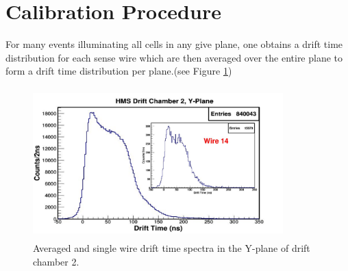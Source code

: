 \documentclass[journal, a4paper]{IEEEtran}
\begin{document}
\section{Calibration Procedure}
\noindent For many events illuminating all cells in any give plane, one obtains a drift time distribution
for each sense wire which are then averaged over the entire plane to form a drift time distribution per plane.(see Figure \ref{fig:hdc2y1_time})
\begin{figure}[!ht]
  \centering
  \includegraphics[width=3.8in, height=2.3in]{hdc2y1_time.pdf}
  \caption{Averaged and single wire drift time spectra in the Y-plane of drift chamber 2.}
  \label{fig:hdc2y1_time}
\end{figure}
\end{document}
